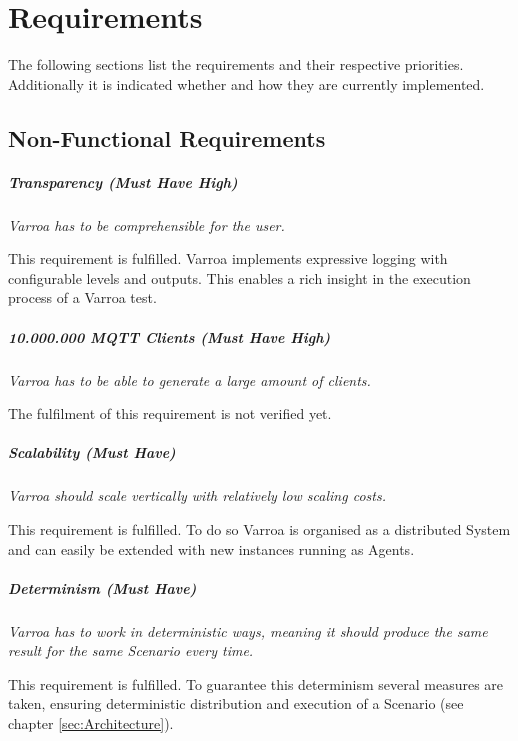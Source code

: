 \chapter{Requirements}
The following sections list the requirements and their respective priorities.
Additionally it is indicated whether and how they are currently implemented.

\section{Non-Functional Requirements}

\paragraph{Transparency (Must Have High)}\label{sec:Transparency}
\emph{Varroa has to be comprehensible for the user.}

This requirement is fulfilled.
Varroa implements expressive logging with configurable levels and outputs.
This enables a rich insight in the execution process of a Varroa test.

\paragraph{10.000.000 MQTT Clients (Must Have High)} 
\emph{Varroa has to be able to generate a large amount of clients.}

The fulfilment of this requirement is not verified yet.

\paragraph{Scalability (Must Have)} 
\emph{Varroa should scale vertically with relatively low scaling costs.}

This requirement is fulfilled.
To do so Varroa is organised as a distributed System and can easily be extended with new instances running as Agents.

\paragraph{Determinism (Must Have)} 
\emph{Varroa has to work in deterministic ways, meaning it should produce the same result for the same Scenario every time.}

This requirement is fulfilled.
To guarantee this determinism several measures are taken, ensuring deterministic distribution and execution of a Scenario (see chapter \ref{sec:Architecture}).

